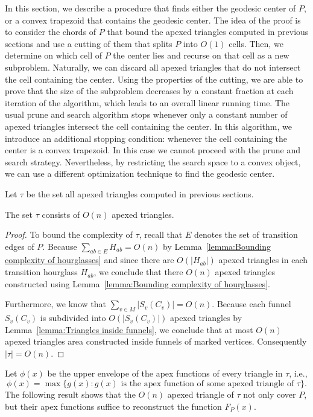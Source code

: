 \documentclass[a4paper,UKenglish]{lipics}
\newcommand{\F}[2]{\ensuremath{F_{\scriptscriptstyle #1}(#2)}}
\newcommand{\fn}[2]{\ensuremath{S_{\scriptscriptstyle #1}(#2)}}
\begin{document}
In this section, we describe a procedure that finds either the geodesic center of $P$, or a convex trapezoid that contains the geodesic center.
The idea of the proof is to consider the chords of $P$ that bound the apexed triangles computed in previous sections and use a cutting of them that splits $P$ into $O(1)$ cells. Then, we determine on which cell of $P$ the center lies and recurse on that cell as a new subproblem. Naturally, we can discard all apexed triangles that do not intersect the cell containing the center. Using the properties of the cutting, we are able to prove that the size of the subproblem decreases by a constant fraction at each iteration of the algorithm, which leads to an overall linear running time. The usual prune and search algorithm stops whenever only a constant number of apexed triangles intersect the cell containing the center. In this algorithm, we introduce an additional stopping condition: whenever the cell containing the center is a convex trapezoid. In this case we cannot proceed with the prune and search strategy. Nevertheless, by restricting the search space to a convex object, we can use a different optimization technique to find the geodesic center.


Let $\tau$ be the set all apexed triangles computed in previous sections. 

\begin{lemma}\label{lemma:Size of tau}
The set $\tau$ consists of $O(n)$ apexed triangles.
\end{lemma}
\begin{proof}
To bound the complexity of $\tau$, recall that $E$ denotes the set of transition edges of $P$.
Because $\sum_{ab\in E} H_{ab} = O(n)$ by Lemma~\ref{lemma:Bounding complexity of hourglasses} and since there are $O(|H_{ab}|)$ apexed triangles in each transition hourglass $H_{ab}$, we conclude that there $O(n)$ apexed triangles constructed using Lemma~\ref{lemma:Bounding complexity of hourglasses}.

Furthermore, we know that $\sum_{v\in M} |\fn{v}{C_v}| = O(n)$. Because each funnel $\fn{v}{C_v}$ is subdivided into $O(|\fn{v}{C_v}|)$ apexed triangles by Lemma~\ref{lemma:Triangles inside funnels}, we conclude that at most $O(n)$ apexed triangles area constructed inside funnels of marked vertices. Consequently $|\tau| = O(n)$.
\end{proof}




Let $\phi(x)$ be the upper envelope of the apex functions of every triangle in $\tau$, i.e., $$\phi(x) = \max\{g(x) : g(x)\text{ is the apex function of some apexed triangle of }\tau\}.$$
The following result shows that the $O(n)$ apexed triangle of $\tau$ not only cover $P$, but their apex functions suffice to reconstruct the function $\F{P}{x}$.
\end{document}
